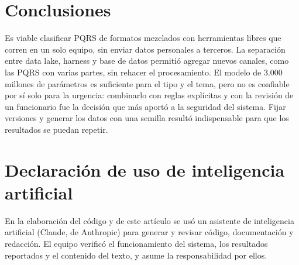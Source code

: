 \documentclass[conference]{IEEEtran}
\begin{document}
\section{Conclusiones}
Es viable clasificar PQRS de formatos mezclados con herramientas libres que corren en un solo equipo, sin enviar datos personales a terceros. La separación entre data lake, harness y base de datos permitió agregar nuevos canales, como las PQRS con varias partes, sin rehacer el procesamiento. El modelo de 3.000 millones de parámetros es suficiente para el tipo y el tema, pero no es confiable por sí solo para la urgencia: combinarlo con reglas explícitas y con la revisión de un funcionario fue la decisión que más aportó a la seguridad del sistema. Fijar versiones y generar los datos con una semilla resultó indispensable para que los resultados se puedan repetir.

\section*{Declaración de uso de inteligencia artificial}
En la elaboración del código y de este artículo se usó un asistente de inteligencia artificial (Claude, de Anthropic) para generar y revisar código, documentación y redacción. El equipo verificó el funcionamiento del sistema, los resultados reportados y el contenido del texto, y asume la responsabilidad por ellos.
\end{document}
